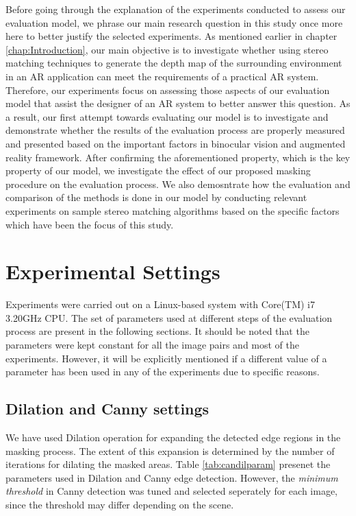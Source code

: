 Before going through the explanation of the experiments conducted to assess our evaluation model, we phrase our main research question in this
study once more here to better justify the selected experiments. 
As mentioned earlier in chapter \ref{chap:Introduction}, our main objective is to investigate whether using 
stereo matching techniques to generate the depth map of the 
surrounding environment in an AR application can meet the requirements of a practical AR system. 
Therefore, our experiments focus 
on assessing those aspects of our evaluation model that assist the designer of an AR system to better answer this question.
As a result, our first attempt towards evaluating our model is to investigate and demonstrate whether the results of the evaluation process 
are properly measured and presented based on the important factors in binocular vision and augmented reality framework.
After confirming the aforementioned property, which is the key property of our model, we investigate the effect of our proposed masking 
procedure on the evaluation process. 
We also demosntrate how the evaluation and comparison of the methods is done in our model by conducting relevant 
experiments on sample stereo matching algorithms based on the specific factors
which have been the focus of this study.

\section{Experimental Settings}
Experiments were carried out on a Linux-based system with Core(TM) i7 3.20GHz CPU. 
The set of parameters used at different steps of the evaluation process are present in the following sections.
It should be noted that the parameters were kept constant for all the image pairs and most of the experiments. 
However, it will be explicitly mentioned if a different value of a parameter has been used in any of the experiments due to specific reasons.

\subsection{Dilation and Canny settings}
We have used Dilation operation for expanding the detected edge regions in the masking process. The extent of this expansion
is determined by the number of iterations for dilating the masked areas. Table \ref{tab:candilparam} presenet the parameters used in Dilation
and Canny edge detection. However, the \textit{minimum threshold} in Canny detection was tuned and selected seperately for each image, 
since the threshold may differ depending on the scene.

